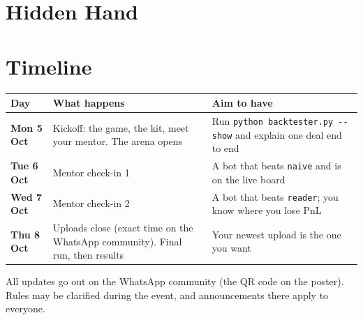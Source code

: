 \documentclass[11pt,a4paper]{article}
\newcommand{\code}[1]{\texttt{#1}}
\begin{document}
\section*{Hidden Hand}


\section{Timeline}

\begin{center}
\begin{tabularx}{\linewidth}{@{}>{\bfseries}l L L@{}}
\toprule
\textbf{Day} & \textbf{What happens} & \textbf{Aim to have} \\
\midrule
Mon 5 Oct & Kickoff: the game, the kit, meet your mentor. The arena opens &
  Run \code{python backtester.py -{}-show} and explain one deal end to end \\
Tue 6 Oct & Mentor check-in 1 & A bot that beats \code{naive} and is on the live board \\
Wed 7 Oct & Mentor check-in 2 & A bot that beats \code{reader}; you know where you lose PnL \\
Thu 8 Oct & Uploads close (exact time on the WhatsApp community). Final run, then results &
  Your newest upload is the one you want \\
\bottomrule
\end{tabularx}
\end{center}

All updates go out on the WhatsApp community (the QR code on the poster). Rules may be
clarified during the event, and announcements there apply to everyone.
\end{document}
